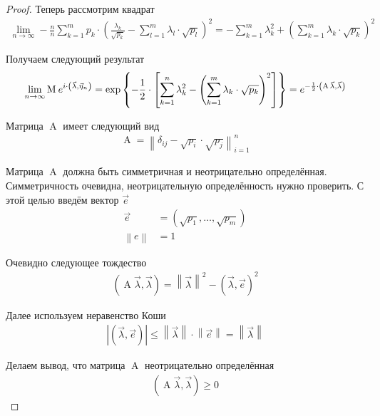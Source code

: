 \begin{proof}
  Теперь рассмотрим квадрат
  \begin{align*}
      \lim_{n \to \infty} -\frac{n}{n}\sum_{k=1}^{m} p_k
      \cdot \left( \frac{\lambda_k}{\sqrt{p_k}}
      - \sum_{l=1}^{m}\lambda_l \cdot \sqrt{p_l} \right)^2
      = - \sum_{k=1}^{m}\lambda_k^2
      + \left( \sum_{k=1}^{m}\lambda_k \cdot \sqrt{p_k} \right)^2
  \end{align*}

  Получаем следующий результат
  \begin{align*}
      \lim_{n \to \infty} \operatorname{M}_{} e^{
      i \cdot \left( \vec{\lambda}, \vec{\eta}_n \right)}
      = \exp{\left\{ - \frac{1}{2} \cdot \left[ \sum_{k=1}^{n}\lambda_k^2
          - \left( \sum_{k=1}^{m}\lambda_k \cdot \sqrt{p_k}
        \right)^2\right] \right\}}
      = e^{-\frac{1}{2} \cdot \left(
          \operatorname{A} \vec{\lambda}, \vec{\lambda} \right)}
  \end{align*}

  Матрица $\operatorname{A}$ имеет следующий вид
  \begin{align*}
      \operatorname{A}
      = \left\| \delta_{ij} - \sqrt{p_i} \cdot \sqrt{p_j} \right\|_{i=1}^n
  \end{align*}

  Матрица $\operatorname{A}$ должна быть симметричная и неотрицательно
  определённая. Симметричность очевидна, неотрицательную определённость
  нужно проверить. С этой целью введём вектор $\vec{e}$
  \begin{align*}
      \vec{e} &= \left( \sqrt{p_1}, \dots, \sqrt{p_m} \right) \\
      \left\| e \right\| &= 1
  \end{align*}

  Очевидно следующее тождество
  \begin{align*}
      \left( \operatorname{A} \vec{\lambda}, \vec{\lambda} \right)
      = \left\| \vec{\lambda} \right\|^2
      - \left( \vec{\lambda}, \vec{e} \right)^2
  \end{align*}

  Далее используем неравенство Коши
  \begin{align*}
      \left| \left( \vec{\lambda}, \vec{e} \right) \right|
      \le \left\| \vec{\lambda} \right\| \cdot \left\| \vec{e} \right\|
      = \left\| \vec{\lambda} \right\|
  \end{align*}

  Делаем вывод, что матрица $\operatorname{A}$ неотрицательно определённая
  \begin{align*}
      \left( \operatorname{A} \vec{\lambda}, \vec{\lambda} \right) \ge 0
  \end{align*}


\end{proof}
